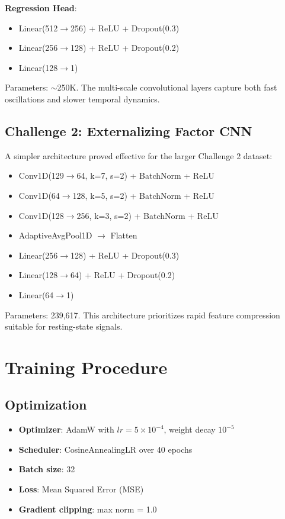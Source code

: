 \documentclass[10pt,twocolumn]{article}
\begin{document}
\textbf{Regression Head}:
\begin{itemize}
    \item Linear(512$\rightarrow$256) + ReLU + Dropout(0.3)
    \item Linear(256$\rightarrow$128) + ReLU + Dropout(0.2)
    \item Linear(128$\rightarrow$1)
\end{itemize}

Parameters: $\sim$250K. The multi-scale convolutional layers capture both fast oscillations and slower temporal dynamics.

\subsection{Challenge 2: Externalizing Factor CNN}
A simpler architecture proved effective for the larger Challenge 2 dataset:

\begin{itemize}
    \item Conv1D(129$\rightarrow$64, k=7, s=2) + BatchNorm + ReLU
    \item Conv1D(64$\rightarrow$128, k=5, s=2) + BatchNorm + ReLU
    \item Conv1D(128$\rightarrow$256, k=3, s=2) + BatchNorm + ReLU
    \item AdaptiveAvgPool1D $\rightarrow$ Flatten
    \item Linear(256$\rightarrow$128) + ReLU + Dropout(0.3)
    \item Linear(128$\rightarrow$64) + ReLU + Dropout(0.2)
    \item Linear(64$\rightarrow$1)
\end{itemize}

Parameters: 239,617. This architecture prioritizes rapid feature compression suitable for resting-state signals.

\section{Training Procedure}

\subsection{Optimization}
\begin{itemize}
    \item \textbf{Optimizer}: AdamW with $lr=5\times10^{-4}$, weight decay $10^{-5}$
    \item \textbf{Scheduler}: CosineAnnealingLR over 40 epochs
    \item \textbf{Batch size}: 32
    \item \textbf{Loss}: Mean Squared Error (MSE)
    \item \textbf{Gradient clipping}: max norm = 1.0
\end{itemize}
\end{document}
